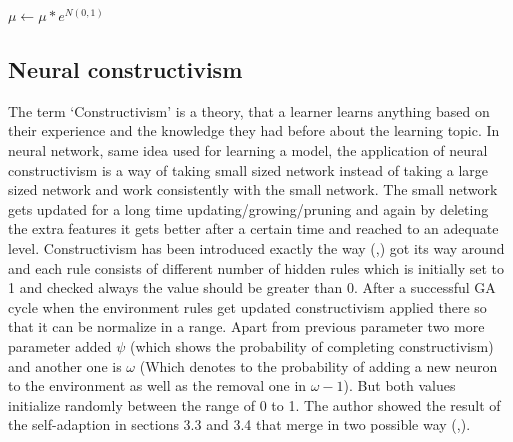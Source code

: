 \documentclass[12pt]{article}
\begin{document}
\begin{center} $\mu \leftarrow \mu * e ^ {N(0,1)} $
\end{center}

\subsection{Neural constructivism }
\label{sec:2}
The term ‘Constructivism’ is a theory, that a learner learns anything based on their experience and the knowledge they had before about the learning topic. In neural network, same idea used for learning a model, the application of neural constructivism is a way of taking small sized network instead of taking a large sized network and work consistently with the small network. The small network gets updated for a long time updating/growing/pruning and again by deleting the extra features it gets better after a certain time and reached to an adequate level.
Constructivism has been introduced exactly the way (\cite{10.1007/3-540-45712-7_54},\cite{doi:10.1162/artl.2006.12.3.353}) got its way around and each rule consists of different number of hidden rules which is initially set to 1 and checked always the value should be greater than 0. After a successful GA cycle when the environment rules get updated constructivism applied there so that it can be normalize in a range. Apart from previous parameter two more parameter added $\psi$ (which shows the probability of completing constructivism) and another one is $\omega$ (Which denotes to the probability of adding a new neuron to the environment as well as the removal one in $\omega-1$). But both values initialize randomly between the range of 0 to 1. 
The author showed the result of the self-adaption in sections 3.3 and 3.4 that merge in two possible way (\cite{10.1007/3-540-45712-7_54},\cite{doi:10.1162/artl.2006.12.3.353}). 
\end{document}
